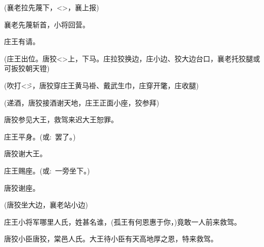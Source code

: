 {

(襄老{\hwfs 拉}先蔑{\hwfs 下}，\textless{}\!\textgreater{}，襄{\hwfs 上报})

襄老\hspace{30pt}先蔑斩首，小将回营。

庄王\hspace{30pt}有请。

(庄王{\hwfs 出位}。唐狡\textless{}\!\textgreater{}{\hwfs 上}，{\hwfs 下马}。庄{\hwfs 拉}狡{\hwfs 换边}，庄{\hwfs 小边}、狡{\hwfs 大边台口}，襄老{\hwfs 托}狡{\hwfs 腿}{\akai 或}{\hwfs 可扳}狡{\hwfs 朝天镫})


({\hwfs 吹打}\textless{}\~\textgreater{}，唐狡{\hwfs 穿}庄王{\hwfs 黄马褂}、{\hwfs 戴}武生巾，庄{\hwfs 穿}开氅，庄{\hwfs 收腿})


({\hwfs 递酒}，唐狡{\hwfs 接酒谢天地}，庄王{\hwfs 正面小座}，狡{\hwfs 参拜})

唐狡\hspace{30pt}参见大王，救驾来迟大王恕罪。

庄王\hspace{30pt}平身。({\akai 或}:~罢了。)

唐狡\hspace{30pt}谢大王。

庄王\hspace{30pt}赐座。({\akai 或}:~一旁坐下。)

唐狡\hspace{30pt}谢座。

(唐狡{\hwfs 坐大边}，襄老{\hwfs 站小边})

庄王\hspace{30pt}小将军哪里人氏，姓甚名谁，(孤王有何恩惠于你，)竟敢一人前来救驾。

唐狡\hspace{30pt}小臣唐狡，棠邑人氏。大王待小臣有天高地厚之恩，特来救驾。

}
